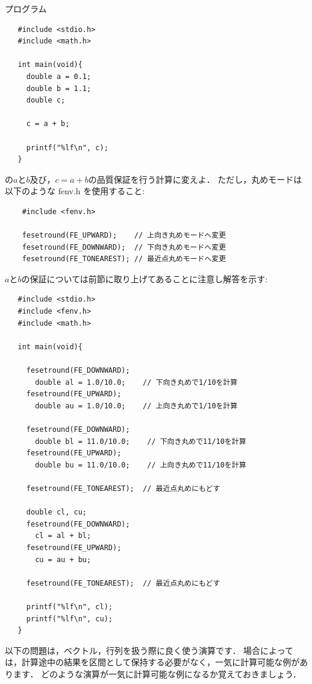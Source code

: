 \Mondai
プログラム
\begin{verbatim}
   #include <stdio.h>
   #include <math.h>
	
   int main(void){
     double a = 0.1;
     double b = 1.1;
     double c;

     c = a + b;
  
     printf("%lf\n", c);
   }
\end{verbatim}
の$a$と$b$及び，$c = a + b$の品質保証を行う計算に変えよ．
ただし，丸めモードは以下のような fenv.h を使用すること:
\begin{verbatim}
	#include <fenv.h>

	fesetround(FE_UPWARD);    // 上向き丸めモードへ変更
	fesetround(FE_DOWNWARD);  // 下向き丸めモードへ変更
	fesetround(FE_TONEAREST); // 最近点丸めモードへ変更
\end{verbatim}

\vspace{5mm}

\Kaitourei
$a$と$b$の保証については前節に取り上げてあることに注意し解答を示す:
\begin{verbatim}
   #include <stdio.h>
   #include <fenv.h>
   #include <math.h>
	
   int main(void){

     fesetround(FE_DOWNWARD);
       double al = 1.0/10.0;    // 下向き丸めで1/10を計算
     fesetround(FE_UPWARD);
       double au = 1.0/10.0;    // 上向き丸めで1/10を計算

     fesetround(FE_DOWNWARD);
       double bl = 11.0/10.0;    // 下向き丸めで11/10を計算
     fesetround(FE_UPWARD);
       double bu = 11.0/10.0;    // 上向き丸めで11/10を計算

     fesetround(FE_TONEAREST);  // 最近点丸めにもどす

     double cl, cu;
     fesetround(FE_DOWNWARD);
       cl = al + bl;
     fesetround(FE_UPWARD);
       cu = au + bu;

     fesetround(FE_TONEAREST);  // 最近点丸めにもどす

     printf("%lf\n", cl);
     printf("%lf\n", cu);
   }
\end{verbatim}

\vspace{5mm}


以下の問題は，ベクトル，行列を扱う際に良く使う演算です．
場合によっては，計算途中の結果を区間として保持する必要がなく，一気に計算可能な例があります．
どのような演算が一気に計算可能な例になるか覚えておきましょう．

\vspace{5mm}

